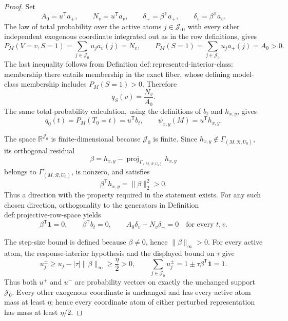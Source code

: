 \documentclass{article}
\begin{document}
\begin{proof}
Set
\[
 A_0=u^{\mathsf T}a_+,
 \qquad N_v=u^{\mathsf T}a_v,
 \qquad \delta_+=\beta^{\mathsf T}a_+,
 \qquad \delta_v=\beta^{\mathsf T}a_v.
\]
The law of total probability over the active atoms \(j\in\mathcal J_0\), with every other independent exogenous coordinate integrated out as in the row definitions, gives
\[
 P_M(V=v,S=1)=\sum_{j\in\mathcal J_0}u_ja_v(j)=N_v,
 \qquad
 P_M(S=1)=\sum_{j\in\mathcal J_0}u_ja_+(j)=A_0>0.
\]
The last inequality follows from Definition \(\mathrm{def{:}represented\text{-}interior\text{-}class}\): membership there entails membership in the exact fiber, whose defining model-class membership includes \(P_M(S=1)>0\). Therefore
\[
 q_S(v)=\frac{N_v}{A_0}.
\]
The same total-probability calculation, using the definitions of \(b_t\) and \(h_{x,y}\), gives
\[
 q_0(t)=P_M(T_0=t)=u^{\mathsf T}b_t,
 \qquad
 \psi_{x,y}(M)=u^{\mathsf T}h_{x,y}.
\]

The space \(\mathbb R^{\mathcal J_0}\) is finite-dimensional because \(\mathcal J_0\) is finite. Since \(h_{x,y}\notin\Gamma_{(M,\mathcal R,U_0)}\), its orthogonal residual
\[
 \beta=h_{x,y}-\operatorname{proj}_{\Gamma_{(M,\mathcal R,U_0)}}h_{x,y}
\]
belongs to \(\Gamma_{(M,\mathcal R,U_0)}^\perp\), is nonzero, and satisfies
\[
 \beta^{\mathsf T}h_{x,y}=\lVert\beta\rVert_2^2>0.
\]
Thus a direction with the property required in the statement exists. For any such chosen direction, orthogonality to the generators in Definition \(\mathrm{def{:}projective\text{-}row\text{-}space}\) yields
\[
 \beta^{\mathsf T}\mathbf 1=0,
 \qquad
 \beta^{\mathsf T}b_t=0,
 \qquad
 A_0\delta_v-N_v\delta_+=0
 \quad\text{for every }t,v.
\]

The step-size bound is defined because \(\beta\ne0\), hence \(\lVert\beta\rVert_\infty>0\). For every active atom, the response-interior hypothesis and the displayed bound on \(\tau\) give
\[
 u_j^{\pm}
 \geq u_j-\lvert\tau\rvert\lVert\beta\rVert_\infty
 \geq\frac{\eta}{2}>0,
 \qquad
 \sum_{j\in\mathcal J_0}u_j^{\pm}
 =1\pm\tau\beta^{\mathsf T}\mathbf 1=1.
\]
Thus both \(u^+\) and \(u^-\) are probability vectors on exactly the unchanged support \(\mathcal J_0\). Every other exogenous coordinate is unchanged and has every active atom mass at least \(\eta\); hence every coordinate atom of either perturbed representation has mass at least \(\eta/2\).


\end{proof}
\end{document}
